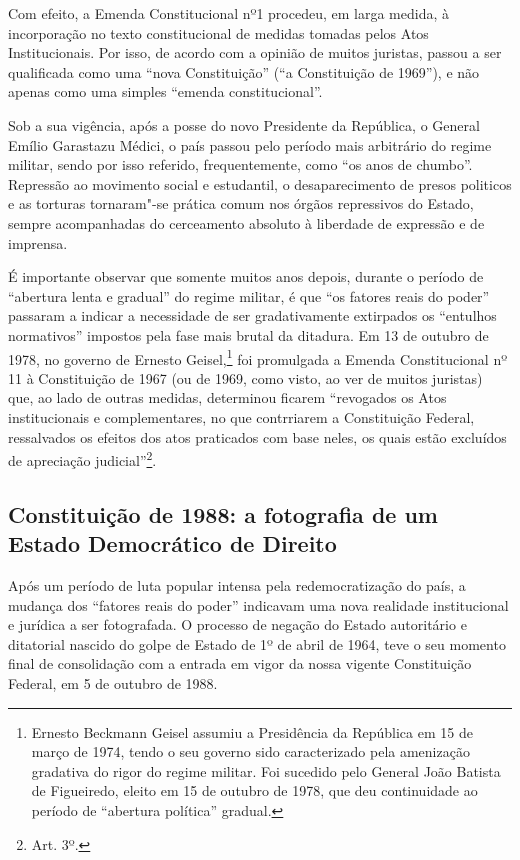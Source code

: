 Com efeito, a Emenda Constitucional nº1 procedeu, em larga medida, à
incorporação no texto constitucional de medidas tomadas pelos Atos
Institucionais. Por isso, de acordo com a opinião de muitos juristas,
passou a ser qualificada como uma ``nova Constituição'' (``a
Constituição de 1969''), e não apenas como uma simples ``emenda
constitucional''.

Sob a sua vigência, após a posse do novo Presidente da República, o
General Emílio Garastazu Médici, o país passou pelo período mais
arbitrário do regime militar, sendo por isso referido, frequentemente,
como ``os anos de chumbo''. Repressão ao movimento social e
estudantil, o desaparecimento de presos politicos e as torturas
tornaram"-se prática comum nos órgãos repressivos do Estado, sempre
acompanhadas do cerceamento absoluto à liberdade de expressão e de
imprensa.

É importante observar que somente muitos anos depois, durante o período
de ``abertura lenta e gradual'' do regime militar, é que ``os
fatores reais do poder'' passaram a indicar a necessidade de ser
gradativamente extirpados os ``entulhos normativos'' impostos pela fase
mais brutal da ditadura. Em 13 de outubro de 1978, no governo de Ernesto
Geisel,\footnote{Ernesto Beckmann Geisel assumiu a Presidência da
  República em 15 de março de 1974, tendo o seu governo sido
  caracterizado pela amenização gradativa do rigor do regime militar.
  Foi sucedido pelo General João Batista de Figueiredo, eleito em 15 de
  outubro de 1978, que deu continuidade ao período de ``abertura
  política'' gradual.} foi promulgada a Emenda Constitucional nº 11 à
Constituição de 1967 (ou de 1969, como visto, ao ver de muitos juristas)
que, ao lado de outras medidas, determinou ficarem ``revogados os
Atos institucionais e complementares, no que contrriarem a Constituição
Federal, ressalvados os efeitos dos atos praticados com base neles, os
quais estão excluídos de apreciação judicial''\footnote{Art. 3º.}.

\subsection{Constituição de 1988: a fotografia de um Estado
Democrático de Direito}

Após um período de luta popular intensa pela redemocratização do país, a
mudança dos ``fatores reais do poder'' indicavam uma nova
realidade institucional e jurídica a ser fotografada. O processo de
negação do Estado autoritário e ditatorial nascido do golpe de Estado de
1º de abril de 1964, teve o seu momento final de consolidação com a
entrada em vigor da nossa vigente Constituição Federal, em 5 de outubro
de 1988.

